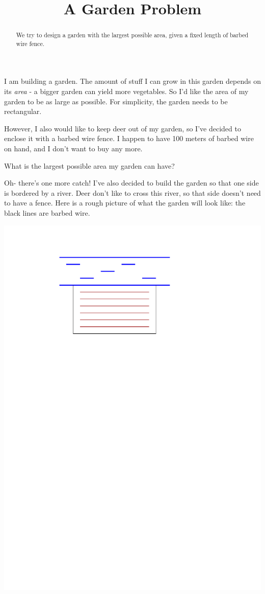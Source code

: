\documentclass{ximera}
\title{A Garden Problem}
\begin{document}
\begin{abstract}
We try to design a garden with the largest possible area, given a fixed length of barbed wire fence.
\end{abstract}

I am building a garden. The amount of stuff I can grow in this garden depends on its \emph{area} - a bigger garden can yield more vegetables. So I'd like the area of my garden to be as large as possible. For simplicity, the garden needs to be rectangular.

However, I also would like to keep deer out of my garden, so I've decided to enclose it with a barbed wire fence. I happen to have 100 meters of barbed wire on hand, and I don't want to buy any more.

\begin{question}
What is the largest possible area my garden can have?
\end{question}

Oh- there's one more catch! I've also decided to build the garden so that one side is bordered by a river. Deer don't like to cross this river, so that side doesn't need to have a fence. Here is a rough picture of what the garden will look like: the black lines are barbed wire.

\begin{center}
\includegraphics[scale=0.5]{GardenFig}
\end{center}
\end{document}
